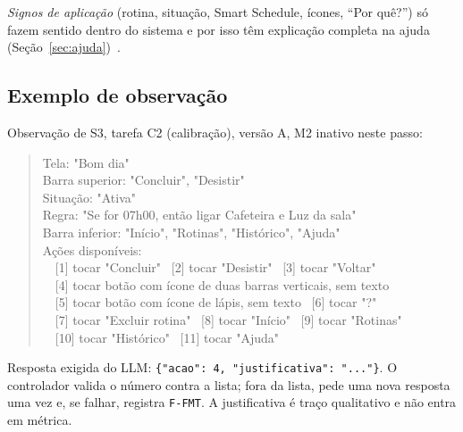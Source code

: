 \documentclass[conference,onecolumn]{IEEEtran}
\begin{document}
\begin{table}[!h]
\caption{Esquema de signos e paridade --- S1, S5, S7, S8 e barras}
\label{tab:signos1}
\centering
\scriptsize

\end{table}

\begin{table}[!h]
\caption{Esquema de signos e paridade --- S2, S3, S4, ajuda e diálogos}
\label{tab:signos2}
\centering
\scriptsize

\end{table}

\textit{Signos de aplicação} (rotina, situação, Smart Schedule, ícones, ``Por quê?'') só fazem sentido dentro do sistema e por isso têm explicação completa na ajuda (Seção~\ref{sec:ajuda})~\cite{barbosa2010}.

\subsection{Exemplo de observação}
Observação de S3, tarefa C2 (calibração), versão A, M2 inativo neste passo:
\begin{quote}\footnotesize\ttfamily
Tela: "Bom dia"\\
Barra superior: "Concluir", "Desistir"\\
Situação: "Ativa"\\
Regra: "Se for 07h00, então ligar Cafeteira e Luz da sala"\\
Barra inferior: "Início", "Rotinas", "Histórico", "Ajuda"\\
Ações disponíveis:\\
\ \ [1] tocar "Concluir" \ [2] tocar "Desistir" \ [3] tocar "Voltar"\\
\ \ [4] tocar botão com ícone de duas barras verticais, sem texto\\
\ \ [5] tocar botão com ícone de lápis, sem texto \ [6] tocar "?"\\
\ \ [7] tocar "Excluir rotina" \ [8] tocar "Início" \ [9] tocar "Rotinas"\\
\ \ [10] tocar "Histórico" \ [11] tocar "Ajuda"
\end{quote}
Resposta exigida do LLM: \texttt{\{"acao": 4, "justificativa": "..."\}}. O controlador valida o número contra a lista; fora da lista, pede uma nova resposta uma vez e, se falhar, registra \texttt{F-FMT}. A justificativa é traço qualitativo e não entra em métrica.
\end{document}

